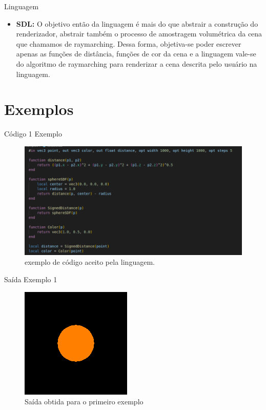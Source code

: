 \documentclass[2pt]{beamer} %
\begin{document}
\begin{frame}{Linguagem}
\begin{itemize}
\item \textbf{SDL:} O objetivo então da linguagem é mais do que abstrair a construção do renderizador, abstrair também o processo de amostragem volumétrica da cena que chamamos de raymarching. Dessa forma, objetiva-se poder escrever apenas as funções de distância, funções de cor da cena e a linguagem vale-se do algoritmo de raymarching para renderizar a cena descrita pelo usuário na linguagem.
\end{itemize}
\end{frame}




\section{Exemplos}

\begin{frame}{Código 1 Exemplo}


\begin{figure}
    \centering
    \includegraphics[width=0.7\linewidth]{imgs/exemplo_codigo.png}
    \caption{exemplo de código aceito pela linguagem.}
    \label{fig:enter-label}
\end{figure}
\end{frame}




\begin{frame}{Saída Exemplo 1}


\begin{figure}
    \centering
    \includegraphics[width=0.5\linewidth]{imgs/ex1.png}
    \caption{Saída obtida para o primeiro exemplo}
    \label{fig:enter-label}
\end{figure}

\end{frame}
\end{document}
